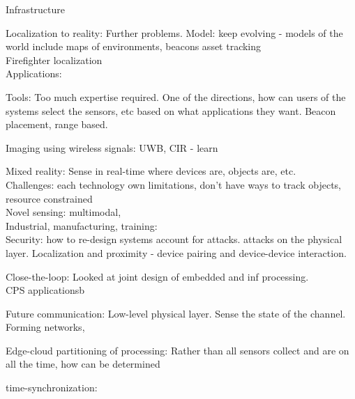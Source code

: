 \documentclass[10pt]{article}
\begin{document}
Infrastructure 

Localization to reality:
Further problems.
Model: keep evolving - models of the world include maps of environments, beacons
asset tracking\\
Firefighter localization\\ 

Applications:

Tools:
Too much expertise required. One of the directions, how can users of the systems select the sensors, etc based on what applications they want.  
Beacon placement, range based.

Imaging using wireless signals:
UWB, CIR - learn 

Mixed reality:
Sense in real-time where devices are, objects are, etc.\\
Challenges: each technology own limitations, don't have ways to track objects, resource constrained\\
Novel sensing: multimodal, \\

Industrial, manufacturing, training:\\

Security:
how to re-design systems account for attacks.
attacks on the physical layer.
Localization and proximity - device pairing and device-device interaction.

Close-the-loop:
Looked at joint design of embedded and inf processing.\\
CPS applicationsb

Future communication:
Low-level physical layer. Sense the state of the channel. \\
Forming networks, 

Edge-cloud partitioning of processing:
Rather than all sensors collect and are on all the time, how can be determined






time-synchronization:\\
\end{document}
